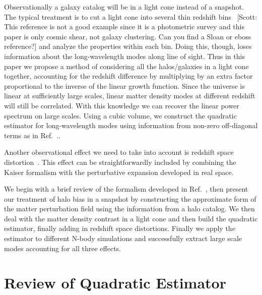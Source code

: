 \documentclass[prd,amsmath,amssymb,floatfix,superscriptaddress,nofootinbib,twocolumn]{revtex4-1}
\newcommand{\scott}[1]{{\color{darkgreen} \, [Scott: #1]}}
\begin{document}
Observationally a galaxy catalog will be in a light cone \cite{Carroll:1997gr} instead of a snapshot. The typical  treatment is to cut a light cone into several thin redshift bins \cite{Troxel:2017xyo}\scott{This reference is not a good example since it is a photometric survey and this paper is only cosmic shear, not galaxy clustering. Can you find a Sloan or eboss reference?} and analyze the properties within each bin. Doing this, though, loses information about the long-wavelength modes along line of sight. Thus in this paper we propose a method of considering all the halos/galaxies in a light cone together, accounting for the redshift difference by multiplying by an extra factor proportional to the inverse of the linear growth function. Since the universe is linear at sufficiently large scales, linear matter density modes at different redshift will still be correlated. With this knowledge we can recover the linear power spectrum on large scales. Using a cubic volume, we construct the quadratic estimator for long-wavelength modes using information from non-zero off-diagonal terms as in Ref.~.\cite{Li:2020fir}.

Another observational effect we need to take into account is redshift space distortion~\cite{Kaiser:1987rsd}. This effect can be straightforwardly included by combining the Kaiser formalism with the perturbative expansion developed in real space.

We begin with a brief review of the formalism developed in Ref.~\cite{Li:2020fir}, then present our treatment of halo bias in a snapshot by constructing the approximate form of the matter perturbation field using the information from a halo catalog. We then deal with the matter density contrast in a light cone and then build the quadratic estimator, finally adding in redshift space distortions. Finally we apply the estimator to different N-body simulations and successfully extract large scale modes accounting for all three effects. 

\section{Review of Quadratic Estimator}
\end{document}
